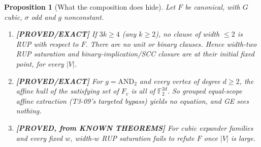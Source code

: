 \documentclass[11pt]{article}
\newtheorem{proposition}{Proposition}
\theoremstyle{definition}
\theoremstyle{remark}
\newcommand{\lab}[1]{\textbf{[#1]}}
\newcommand{\F}{\mathbb{F}}
\begin{document}
\begin{proposition}[What the composition does hide]\label{prop:stall}
Let $F$ be canonical, with $G$ cubic, $\sigma$ odd and $g$ nonconstant.
\begin{enumerate}
\item[(i)] \lab{PROVED/EXACT} If $3k\ge4$ (any $k\ge2$), no clause of width $\le2$ is RUP
with respect to $F$. There are no unit or binary clauses. Hence width-two RUP saturation and
binary-implication/SCC closure are at their initial fixed point, for every $|V|$.
\item[(ii)] \lab{PROVED/EXACT} For $g=\mathrm{AND}_2$ and every vertex of degree $d\ge2$, the
affine hull of the satisfying set of $F_v$ is all of $\F_2^{2d}$. So grouped equal-scope
affine extraction (T3-09's targeted bypass) yields no equation, and GE sees nothing.
\item[(iii)] \lab{PROVED, from KNOWN THEOREMS} For cubic expander families and every fixed
$w$, width-$w$ RUP saturation fails to refute $F$ once $|V|$ is large.
\end{enumerate}
\end{proposition}
\end{document}
